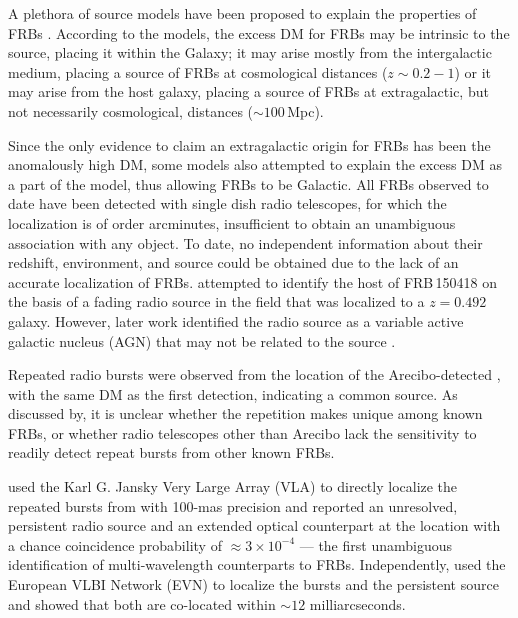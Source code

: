 \documentclass[iop]{emulateapj}
\begin{document}
A plethora of source models have been proposed to explain the properties of FRBs \citep[see e.g.][for a brief review]{katz16}. According to the models, the excess DM for FRBs may be intrinsic to the source, placing it within the Galaxy; it may arise mostly from the intergalactic medium, placing a source of FRBs at cosmological distances ($z\sim0.2-1$) or it may arise from the host galaxy, placing a source of FRBs at extragalactic, but not necessarily cosmological, distances ($\sim100$\,Mpc).

Since the only evidence to claim an extragalactic origin for FRBs has been the anomalously high DM, some models also attempted to explain the excess DM as a part of the model, thus allowing FRBs to be Galactic. All FRBs observed to date have been detected with single dish radio telescopes, for which the localization is of order arcminutes, insufficient to obtain an unambiguous association with any object. To date, no independent information about their redshift, environment, and source could be obtained due to the lack of an accurate localization of FRBs. \citet{kjb+16} attempted to identify the host of FRB\,150418 on the basis of a fading radio source in the field that was localized to a $z=0.492$ galaxy. However, later work identified the radio source as a variable active galactic nucleus (AGN) that may not be related to the source \citep{wb16,bbt+16,gmg+16,jkb+16}.

Repeated radio bursts were observed from the location of the Arecibo-detected , with the same DM as the first detection, indicating a common source. As discussed by, it is unclear whether the repetition makes unique among known FRBs, or whether radio telescopes other than Arecibo lack the sensitivity to readily detect repeat bursts from other known FRBs.

\citet{clw+16} used the Karl G. Jansky Very Large Array (VLA) to directly localize the repeated bursts from  with 100-mas precision and reported an unresolved, persistent radio source and an extended optical counterpart at the location with a chance coincidence probability of $\approx 3\times10^{-4}$ --- the first unambiguous identification of multi-wavelength counterparts to FRBs. Independently,  used the European VLBI Network (EVN) to localize the bursts and the persistent source and showed that both are co-located within $\sim12$ milliarcseconds.
\end{document}
